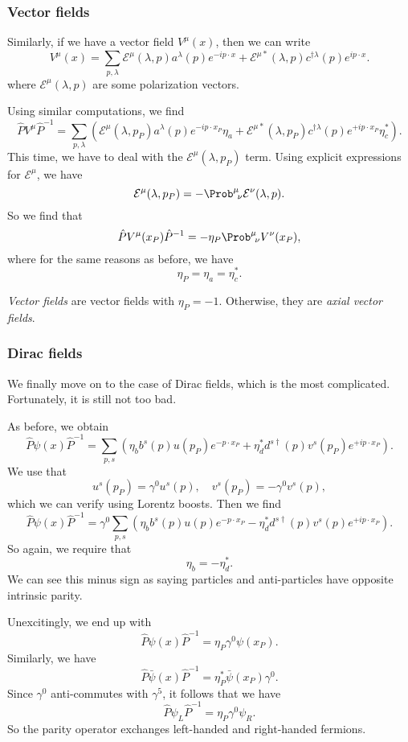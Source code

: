 \documentclass[a4paper]{article}
\begin{document}
\subsubsection*{Vector fields}
Similarly, if we have a vector field $V^\mu (x)$, then we can write
\[
  V^\mu(x) = \sum_{p, \lambda} \mathcal{E}^\mu(\lambda, p) a^\lambda(p) e^{-ip\cdot x} + \mathcal{E}^{\mu *} (\lambda, p) c^{\dagger \lambda} (p) e^{ip\cdot x}.
\]
where $\mathcal{E}^\mu(\lambda, p)$ are some polarization vectors.

Using similar computations, we find
\[
  \hat{P} V^\mu \hat{P}^{-1} = \sum_{p, \lambda} \left(\mathcal{E}^\mu (\lambda, p_P)a^\lambda(p) e^{-ip\cdot x_P} \eta_a + \mathcal{E}^{\mu*}(\lambda, p_P) c^{\dagger\lambda} (p) e^{+ip\cdot x_P} \eta_c^*\right).
\]
This time, we have to deal with the $\mathcal{E}^\mu(\lambda, p_P)$ term. Using explicit expressions for $\mathcal{E}^\mu$, we have
\[
  \mathcal{E}^\mu(\lambda, p_P) = - \Prob^\mu\!_\nu \mathcal{E}^\nu (\lambda, p).
\]
So we find that
\[
  \hat{P} V^\mu(x_P) \hat{P}^{-1} = - \eta_P \Prob^\mu\!_\nu V^\nu(x_P),
\]
where for the same reasons as before, we have
\[
  \eta_P = \eta_a = \eta_c^*.
\]
\begin{defi}
  \emph{Vector fields} are vector fields with $\eta_P = -1$. Otherwise, they are \emph{axial vector fields}.
\end{defi} %

\subsubsection*{Dirac fields}
We finally move on to the case of Dirac fields, which is the most complicated. Fortunately, it is still not too bad.

As before, we obtain
\[
  \hat{P}\psi(x) \hat{P}^{-1} = \sum_{p, s}\left( \eta_b b^s(p) u(p_P) e^{-p\cdot x_P} + \eta_d^* d^{s\dagger}(p) v^s(p_P) e^{+ip\cdot x_P}\right).
\]
We use that
\[
  u^s(p_P) = \gamma^0 u^s(p),\quad v^s(p_P) = - \gamma^0 v^s(p),
\]
which we can verify using Lorentz boosts. Then we find
\[
  \hat{P} \psi(x) \hat{P}^{-1} = \gamma^0 \sum_{p, s}\left( \eta_b b^s(p) u(p) e^{-p\cdot x_P} - \eta_d^* d^{s\dagger}(p) v^s(p) e^{+ip\cdot x_P}\right).
\]
So again, we require that
\[
  \eta_b = - \eta_d^*.
\]
We can see this minus sign as saying particles and anti-particles have opposite intrinsic parity.

Unexcitingly, we end up with
\[
  \hat{P} \psi(x) \hat{P}^{-1} = \eta_P \gamma^0 \psi(x_P).
\]
Similarly, we have
\[
  \hat{P} \bar\psi(x) \hat{P}^{-1} = \eta_P^* \bar\psi(x_P) \gamma^0.
\]
Since $\gamma^0$ anti-commutes with $\gamma^5$, it follows that we have
\[
  \hat{P} \psi_L \hat{P}^{-1} = \eta_P \gamma^0 \psi_R.
\]
So the parity operator exchanges left-handed and right-handed fermions.
\end{document}
